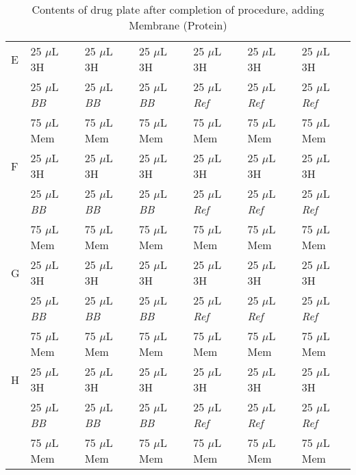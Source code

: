 \documentclass[12pt, letterpaper]{article}
\begin{document}
\begin{table}[h]
\begin{center}
\begin{tabular}{|l|lll|lll|}
        E & 25 $\mu$L 3H        & 25 $\mu$L 3H        & 25 $\mu$L 3H        & 25 $\mu$L 3H         & 25 $\mu$L 3H         & 25 $\mu$L 3H         \\
        & 25 $\mu$L \emph{BB} & 25 $\mu$L \emph{BB} & 25 $\mu$L \emph{BB} & 25 $\mu$L \emph{Ref} & 25 $\mu$L \emph{Ref} & 25 $\mu$L \emph{Ref} \\
        & 75 $\mu$L Mem       & 75 $\mu$L Mem       & 75 $\mu$L Mem       & 75 $\mu$L Mem        & 75 $\mu$L Mem        & 75 $\mu$L Mem        \\ \hline
        F & 25 $\mu$L 3H        & 25 $\mu$L 3H        & 25 $\mu$L 3H        & 25 $\mu$L 3H         & 25 $\mu$L 3H         & 25 $\mu$L 3H         \\
        & 25 $\mu$L \emph{BB} & 25 $\mu$L \emph{BB} & 25 $\mu$L \emph{BB} & 25 $\mu$L \emph{Ref} & 25 $\mu$L \emph{Ref} & 25 $\mu$L \emph{Ref} \\
        & 75 $\mu$L Mem       & 75 $\mu$L Mem       & 75 $\mu$L Mem       & 75 $\mu$L Mem        & 75 $\mu$L Mem        & 75 $\mu$L Mem        \\ \hline
        G & 25 $\mu$L 3H        & 25 $\mu$L 3H        & 25 $\mu$L 3H        & 25 $\mu$L 3H         & 25 $\mu$L 3H         & 25 $\mu$L 3H         \\
        & 25 $\mu$L \emph{BB} & 25 $\mu$L \emph{BB} & 25 $\mu$L \emph{BB} & 25 $\mu$L \emph{Ref} & 25 $\mu$L \emph{Ref} & 25 $\mu$L \emph{Ref} \\
        & 75 $\mu$L Mem       & 75 $\mu$L Mem       & 75 $\mu$L Mem       & 75 $\mu$L Mem        & 75 $\mu$L Mem        & 75 $\mu$L Mem        \\ \hline
        H & 25 $\mu$L 3H        & 25 $\mu$L 3H        & 25 $\mu$L 3H        & 25 $\mu$L 3H         & 25 $\mu$L 3H         & 25 $\mu$L 3H         \\
        & 25 $\mu$L \emph{BB} & 25 $\mu$L \emph{BB} & 25 $\mu$L \emph{BB} & 25 $\mu$L \emph{Ref} & 25 $\mu$L \emph{Ref} & 25 $\mu$L \emph{Ref} \\
        & 75 $\mu$L Mem       & 75 $\mu$L Mem       & 75 $\mu$L Mem       & 75 $\mu$L Mem        & 75 $\mu$L Mem        & 75 $\mu$L Mem        \\ \hline
        \end{tabular}
    \caption{Contents of drug plate after completion of procedure, adding Membrane (Protein)}
    \end{center}
\end{table}
\end{document}
